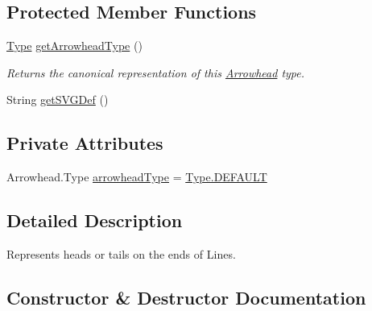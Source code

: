 \subsection*{Protected Member Functions}
\begin{DoxyCompactItemize}
\item 
\hyperlink{enumcom_1_1aarrelaakso_1_1drawl_1_1_arrowhead_1_1_type}{Type} \hyperlink{classcom_1_1aarrelaakso_1_1drawl_1_1_arrowhead_a9826ae8d6876c83ff6e61f12b5afcd1a}{get\+Arrowhead\+Type} ()
\begin{DoxyCompactList}\small\item\em Returns the canonical representation of this \hyperlink{classcom_1_1aarrelaakso_1_1drawl_1_1_arrowhead}{Arrowhead} type. \end{DoxyCompactList}\item 
String \hyperlink{classcom_1_1aarrelaakso_1_1drawl_1_1_arrowhead_a0094c4f48945d782b7e474b15ef06561}{get\+S\+V\+G\+Def} ()
\end{DoxyCompactItemize}
\subsection*{Private Attributes}
\begin{DoxyCompactItemize}
\item 
Arrowhead.\+Type \hyperlink{classcom_1_1aarrelaakso_1_1drawl_1_1_arrowhead_a72183bdf6672377d73b2d9810b6d0ed7}{arrowhead\+Type} = \hyperlink{enumcom_1_1aarrelaakso_1_1drawl_1_1_arrowhead_1_1_type_ae4c70d3cd0853637fba791f2bb29cd8e}{Type.\+D\+E\+F\+A\+U\+LT}
\end{DoxyCompactItemize}


\subsection{Detailed Description}
Represents heads or tails on the ends of Lines. 

\subsection{Constructor \& Destructor Documentation}
\mbox{\label{classcom_1_1aarrelaakso_1_1drawl_1_1_arrowhead_a866fb3900ad67226bad5962031cc7817}} 
